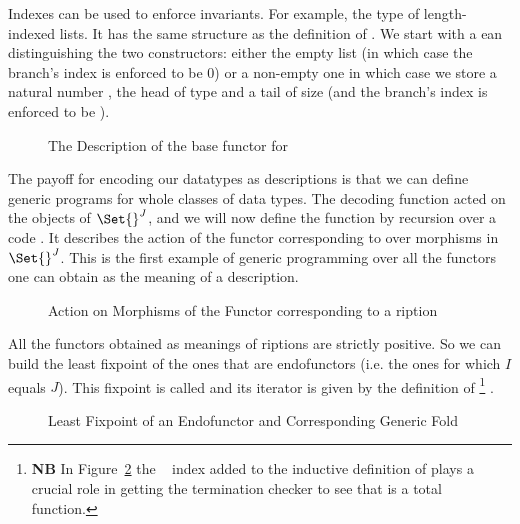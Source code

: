 Indexes can be used to enforce invariants. For example, the type {  }
of length-indexed lists. It has the same structure as the definition of .
We start with a ean distinguishing the two constructors: either
the empty list (in which case the branch's index is enforced to be $0$) or a
non-empty one in which case we store a natural number , the head of type
 and a tail of size  (and the branch's index is enforced to be
 ).

\begin{figure}[h]
\caption{The Description of the base functor for   }\label{figure:vecD}
\end{figure}

The payoff for encoding our datatypes as descriptions is that we can define
generic programs for whole classes of data types. The decoding function 
acted on the objects of $\Set{}^J$, and we will now define the function  by
recursion over a code . It describes the action of the functor corresponding
to  over morphisms in $\Set{}^J$. This is the first example of generic
programming over all the functors one can obtain as the meaning of a description.

\begin{figure}[h]
\caption{Action on Morphisms of the Functor corresponding to a ription}
\end{figure}

All the functors obtained as meanings of riptions are strictly
positive. So we can build the least fixpoint of the ones that are endofunctors
(i.e. the ones for which $I$ equals $J$). This fixpoint is called 
and its iterator is given by the definition of  %
\footnote{\textbf{NB}
In Figure~\ref{figure:datamu} the ~\cite{DBLP:journals/corr/abs-1012-4896} index added
to the inductive definition of  plays a crucial role in getting the
termination checker to see that  is a total function.
}
.

\begin{figure}[h]
\caption{Least Fixpoint of an Endofunctor and Corresponding Generic Fold}\label{figure:datamu}
\end{figure}


